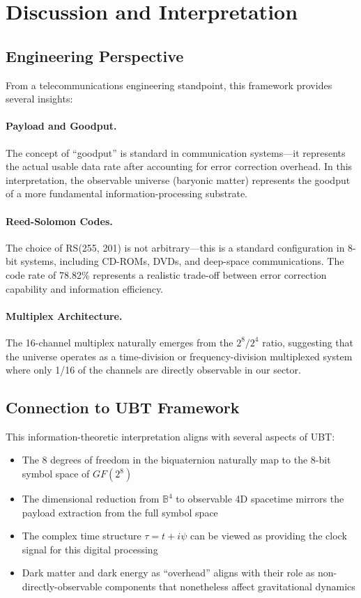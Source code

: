 \section{Discussion and Interpretation}

\subsection{Engineering Perspective}

From a telecommunications engineering standpoint, this framework provides several insights:

\paragraph{Payload and Goodput.} The concept of ``goodput'' is standard in communication systems—it represents the actual usable data rate after accounting for error correction overhead. In this interpretation, the observable universe (baryonic matter) represents the goodput of a more fundamental information-processing substrate.

\paragraph{Reed-Solomon Codes.} The choice of RS(255, 201) is not arbitrary—this is a standard configuration in 8-bit systems, including CD-ROMs, DVDs, and deep-space communications. The code rate of 78.82\% represents a realistic trade-off between error correction capability and information efficiency.

\paragraph{Multiplex Architecture.} The 16-channel multiplex naturally emerges from the $2^8/2^4$ ratio, suggesting that the universe operates as a time-division or frequency-division multiplexed system where only 1/16 of the channels are directly observable in our sector.

\subsection{Connection to UBT Framework}

This information-theoretic interpretation aligns with several aspects of UBT:

\begin{itemize}
    \item The 8 degrees of freedom in the biquaternion naturally map to the 8-bit symbol space of $GF(2^8)$
    \item The dimensional reduction from $\mathbb{B}^4$ to observable 4D spacetime mirrors the payload extraction from the full symbol space
    \item The complex time structure $\tau = t + i\psi$ can be viewed as providing the clock signal for this digital processing
    \item Dark matter and dark energy as ``overhead'' aligns with their role as non-directly-observable components that nonetheless affect gravitational dynamics
\end{itemize}

